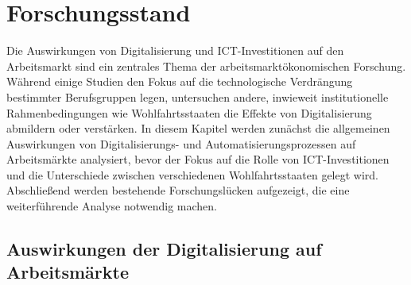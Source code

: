 
\section{Forschungsstand}

Die Auswirkungen von Digitalisierung und \ac{ICT}-Investitionen auf den Arbeitsmarkt sind ein 
zentrales Thema der arbeitsmarktökonomischen Forschung. Während einige Studien den Fokus auf die 
technologische Verdrängung bestimmter Berufsgruppen legen, untersuchen andere, inwieweit 
institutionelle Rahmenbedingungen wie Wohlfahrtsstaaten die Effekte von Digitalisierung abmildern 
oder verstärken. In diesem Kapitel werden zunächst die allgemeinen Auswirkungen von 
Digitalisierungs- und Automatisierungsprozessen auf Arbeitsmärkte analysiert, bevor der Fokus auf 
die Rolle von \ac{ICT}-Investitionen und die Unterschiede zwischen verschiedenen 
Wohlfahrtsstaaten gelegt wird. Abschließend werden bestehende Forschungslücken aufgezeigt, die 
eine weiterführende Analyse notwendig machen.


\subsection{Auswirkungen der Digitalisierung auf Arbeitsmärkte}

